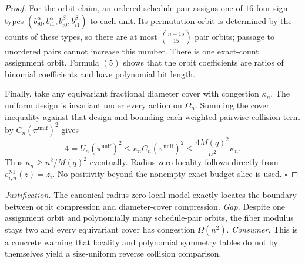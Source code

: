 \documentclass{article}
\begin{document}
\begin{proof}
For the orbit claim, an ordered schedule pair assigns one of \(16\) four-sign types \((b_{i0}^\alpha,b_{i1}^\alpha,b_{i0}^\beta,b_{i1}^\beta)\) to each unit. Its permutation orbit is determined by the counts of these types, so there are at most \(\binom{n+15}{15}\) pair orbits; passage to unordered pairs cannot increase this number. There is one exact-count assignment orbit. Formula \((5)\) shows that the orbit coefficients are ratios of binomial coefficients and have polynomial bit length.

Finally, take any equivariant fractional diameter cover with congestion \(\kappa_n\). The uniform design is invariant under every action on \(\Omega_n\). Summing the cover inequality against that design and bounding each weighted pairwise collision term by \(C_n(\pi^{\mathrm{unif}})^2\) gives
\[
 4=U_n(\pi^{\mathrm{unif}})^2
 \le\kappa_n C_n(\pi^{\mathrm{unif}})^2
 \le\frac{4M(q)^2}{n^2}\kappa_n. \tag{10}
\]
Thus \(\kappa_n\ge n^2/M(q)^2\) eventually. Radius-zero locality follows directly from \(e^{\mathrm{NI}}_{i,n}(z)=z_i\). No positivity beyond the nonempty exact-budget slice is used. \(\square\)
\end{proof}
\par\smallskip\noindent \textit{Justification.} The canonical radius-zero local model exactly locates the boundary between orbit compression and diameter-cover compression. \textit{Gap.} Despite one assignment orbit and polynomially many schedule-pair orbits, the fiber modulus stays two and every equivariant cover has congestion \(\Omega(n^2)\). \textit{Consumer.} This is a concrete warning that locality and polynomial symmetry tables do not by themselves yield a size-uniform reverse collision comparison.
\end{document}
